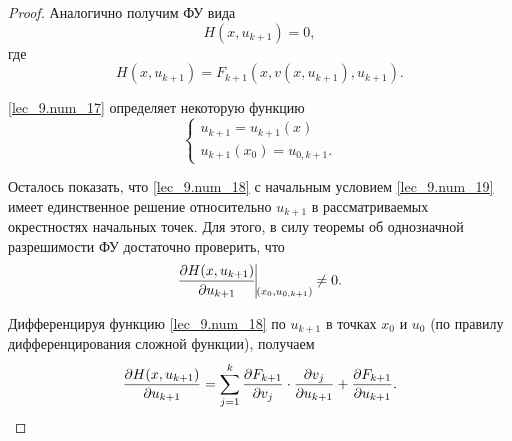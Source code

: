 \documentclass[../../main.tex]{subfiles}
\begin{document}
\begin{proof}
    Аналогично получим ФУ вида
    \begin{equation}
        \label{lec_9.num_17}
        H(x, u_{k+1}) = 0,
    \end{equation}
    где
    \begin{equation}
        \label{lec_9.num_18}
        H(x, u_{k+1}) = 
        F_{k+1}\left(x, v(x, u_{k+1}), 
        u_{k+1}\right).
    \end{equation}
    
    \eqref{lec_9.num_17} определяет некоторую функцию
    \begin{equation}
        \label{lec_9.num_19}
        \begin{cases}
        u_{k+1} = u_{k+1}(x)\\
        u_{k+1}(x_0) = u_{0,k+1}.
        \end{cases}
    \end{equation}
    
    Осталось показать, что \eqref{lec_9.num_18} с начальным
    условием \eqref{lec_9.num_19} имеет единственное решение относительно 
    $u_{k+1}$ в рассматриваемых окрестностях начальных
    точек. Для этого, в силу теоремы об однозначной 
    разрешимости ФУ
    достаточно проверить, что
    \begin{equation}
    \label{lec_9.num_20}
    \pderiv{H(x, u_{k+1})}{u_{k+1}} 
    \vline\underset{\left(x_0, u_{0,k+1}\right)}{} \neq 0.
    \end{equation}
    
    Дифференцируя функцию \eqref{lec_9.num_18}
    по $u_{k+1}$ в точках $x_0$ и $u_0$ (по правилу
    дифференцирования сложной функции), получаем
    \begin{equation}
        \label{lec_9.num_22}
        \frac{\partial H(x, u_{k+1})}{\partial u_{k+1}}  =
        \sum_{j = 1}^{k}
        \frac{\partial F_{k+1}}{\partial v_j} \cdot \frac{\partial v_j}{\partial u_{k+1}} + 
        \frac{\partial F_{k+1}}{\partial u_{k+1}}.
    \end{equation}
    

\end{proof}
\end{document}
